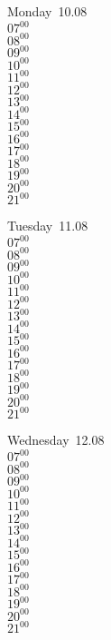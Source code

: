 \documentclass[11pt,a4paper]{book}\usepackage[]{graphicx}\usepackage[]{color}
\begin{document}
\begin{headerbox}
\end{headerbox}
\begin{weekdaybox}
  Monday~10.08\\
  { 
  \vfill
  $07^{00}$\\
$08^{00}$\\
$09^{00}$\\
$10^{00}$\\
$11^{00}$\\
$12^{00}$\\
$13^{00}$\\
$14^{00}$\\
$15^{00}$\\
$16^{00}$\\
$17^{00}$\\
$18^{00}$\\
$19^{00}$\\
$20^{00}$\\
$21^{00}$\\
  }
\end{weekdaybox}
\begin{weekdaybox}
  Tuesday~11.08\\
  { 
  \vfill
  $07^{00}$\\
$08^{00}$\\
$09^{00}$\\
$10^{00}$\\
$11^{00}$\\
$12^{00}$\\
$13^{00}$\\
$14^{00}$\\
$15^{00}$\\
$16^{00}$\\
$17^{00}$\\
$18^{00}$\\
$19^{00}$\\
$20^{00}$\\
$21^{00}$\\
  }
\end{weekdaybox}
\begin{weekdaybox}
  Wednesday~12.08\\
  { 
  \vfill
  $07^{00}$\\
$08^{00}$\\
$09^{00}$\\
$10^{00}$\\
$11^{00}$\\
$12^{00}$\\
$13^{00}$\\
$14^{00}$\\
$15^{00}$\\
$16^{00}$\\
$17^{00}$\\
$18^{00}$\\
$19^{00}$\\
$20^{00}$\\
$21^{00}$\\
  }
\end{weekdaybox}
\end{document}
